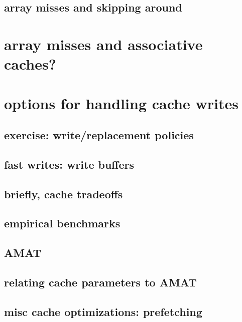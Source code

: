 \subsection{array misses and skipping around}


\section{array misses and associative caches?}


\section{options for handling cache writes}


\subsection{exercise: write/replacement policies}


\subsection{fast writes: write buffers}


\subsection{briefly, cache tradeoffs}



\subsection{empirical benchmarks}


\subsection{AMAT}




\subsection{relating cache parameters to AMAT}



\subsection{misc cache optimizations: prefetching}


